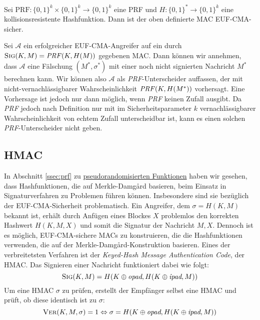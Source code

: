 \begin{theorem} Sei $\text{PRF}\colon\{0,1\}^k \times \{0,1\}^k
  \rightarrow \{0,1\}^k$ eine PRF und $H \colon \{0,1\}^* \rightarrow
  \{0,1\}^k$ eine kollisionsresistente Hashfunktion.  Dann ist der oben
  definierte MAC EUF-CMA-sicher.
\end{theorem} \vspace{10pt}

\begin{beweis}[Entwurf] Sei $\mathcal{A}$ ein erfolgreicher
  EUF-CMA-Angreifer auf ein durch $\textsc{Sig}(K,M) =
  \text{\textit{PRF}}(K,H(M))$ gegebenen MAC. Dann können wir annehmen,
  dass $\mathcal{A}$ eine Fälschung $(M^*,\sigma^*)$ mit einer noch nicht
  signierten Nachricht $M^*$ berechnen kann. Wir können also $\mathcal{A}$
  als \textit{PRF}-Unterscheider auffassen, der mit
  nicht-vernachlässigbarer Wahrscheinlichkeit
  $\text{\textit{PRF}}(K,H(M^*))$ vorhersagt. Eine Vorhersage ist jedoch
  nur dann möglich, wenn \textit{PRF} keinen Zufall ausgibt. Da
  \textit{PRF} jedoch nach Definition nur mit im Sicherheitsparameter $k$ vernachlässigbarer
  Wahrscheinlichkeit von echtem Zufall unterscheidbar ist, kann es einen
  solchen \textit{PRF}-Unterscheider nicht geben.
\end{beweis}

\subsection{HMAC} In Abschnitt \ref{ssec:prf} zu
\hyperref[ssec:prf]{pseudorandomisierten Funktionen}
haben wir gesehen, dass Hashfunktionen, die auf
Merkle-Damgård basieren, beim Einsatz in Signaturverfahren zu Problemen
führen können. Insbesondere sind sie bezüglich der EUF-CMA-Sicherheit
problematisch.  Ein Angreifer, dem $\sigma = H(K,M)$ bekannt ist, erhält
durch Anfügen eines Blockes $X$ problemlos den korrekten Hashwert
$H(K,M,X)$ und somit die Signatur der Nachricht $M,X$.  Dennoch ist es
möglich, EUF-CMA-sichere MACs zu konstruieren, die die Hashfunktionen
verwenden, die auf der Merkle-Damgård-Konstruktion basieren. Eines der verbreitetsten
Verfahren ist der \textit{Keyed-Hash Message Authentication Code}, der
HMAC. Das Signieren einer Nachricht funktioniert dabei wie folgt:
\begin{equation*}
  \textsc{Sig}(K,M) = H(K \oplus \textit{opad}, H(K \oplus
  \textit{ipad}, M))
\end{equation*}
Um eine HMAC $\sigma$ zu prüfen, erstellt der Empfänger selbst eine HMAC
und prüft, ob diese identisch ist zu $\sigma$:
\[\textsc{Ver} (K, M, \sigma) =1 \Leftrightarrow \sigma = H(K \oplus \textit{opad}, H(K \oplus \textit{ipad}, M))\]

